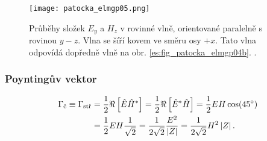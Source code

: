           \begin{figure}[ht!]
            \centering
            \texttt{[image: patocka\_elmgp05.png]}
            \caption{Průběhy složek \(E_y\) a \(H_z\) v rovinné vlně, orientované paralelně s 
                     rovinou \(y-z\). Vlna se šíří kovem ve směru osy \(+x\). Tato vlna odpovídá 
                     dopředně vlně na obr. \ref{es:fig_patocka_elmgp04b}. \cite[s.~80]{Patocka4}.}
            \label{ES:fig_elmgp05}
          \end{figure}
                
        \subsubsection{Poyntingův vektor}
          \begin{align}\
            \Gamma_\text{č} \equiv \Gamma_\text{stř} 
              &= \frac{1}{2}\Re\left[\hat{E}\hat{H}^*\right] 
               = \frac{1}{2}\Re\left[\hat{E}^*\hat{H}\right]     
               = \frac{1}{2}EH\cos(\SI{45}{\degree})                 \nonumber \\ 
              &= \frac{1}{2}EH\frac{1}{\sqrt{2}}
               = \frac{1}{2\sqrt{2}}\frac{E^2}{\left\lvert Z\right\rvert}
               = \frac{1}{2\sqrt{2}}H^2\left\lvert Z\right\rvert.                      \label{ES:eq_elmagp52}
          \end{align}
